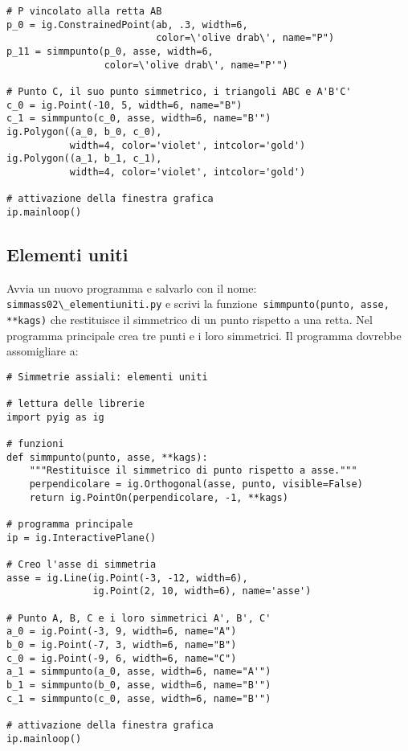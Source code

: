 \begin{itemize} [noitemsep]
\begin{lstlisting}
# P vincolato alla retta AB
p_0 = ig.ConstrainedPoint(ab, .3, width=6, 
                          color=\'olive drab\', name="P")
p_11 = simmpunto(p_0, asse, width=6, 
                 color=\'olive drab\', name="P'")

# Punto C, il suo punto simmetrico, i triangoli ABC e A'B'C'
c_0 = ig.Point(-10, 5, width=6, name="B")
c_1 = simmpunto(c_0, asse, width=6, name="B'")
ig.Polygon((a_0, b_0, c_0), 
           width=4, color='violet', intcolor='gold')
ig.Polygon((a_1, b_1, c_1), 
           width=4, color='violet', intcolor='gold')

# attivazione della finestra grafica
ip.mainloop()
\end{lstlisting}

\end{itemize}


\subsection{Elementi uniti}

Avvia un nuovo programma e salvarlo con il nome: 
\lstinline{simmass02\_elementiuniti.py}
e scrivi la funzione~\lstinline{simmpunto(punto, asse, **kags)} che restituisce 
il simmetrico di un punto rispetto a una retta.
Nel programma principale crea tre punti e i loro simmetrici.
Il programma dovrebbe assomigliare a:

\begin{lstlisting}
# Simmetrie assiali: elementi uniti

# lettura delle librerie
import pyig as ig

# funzioni
def simmpunto(punto, asse, **kags):
    """Restituisce il simmetrico di punto rispetto a asse."""
    perpendicolare = ig.Orthogonal(asse, punto, visible=False)
    return ig.PointOn(perpendicolare, -1, **kags)

# programma principale
ip = ig.InteractivePlane()

# Creo l'asse di simmetria
asse = ig.Line(ig.Point(-3, -12, width=6),
               ig.Point(2, 10, width=6), name='asse')

# Punto A, B, C e i loro simmetrici A', B', C'
a_0 = ig.Point(-3, 9, width=6, name="A")
b_0 = ig.Point(-7, 3, width=6, name="B")
c_0 = ig.Point(-9, 6, width=6, name="C")
a_1 = simmpunto(a_0, asse, width=6, name="A'")
b_1 = simmpunto(b_0, asse, width=6, name="B'")
c_1 = simmpunto(c_0, asse, width=6, name="B'")

# attivazione della finestra grafica
ip.mainloop()
\end{lstlisting}

